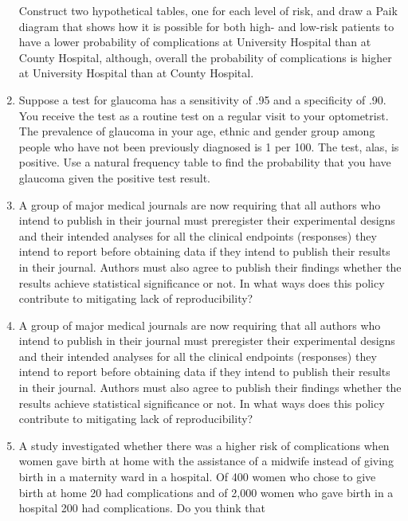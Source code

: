 \documentclass[
]{article}
\begin{document}
\begin{enumerate}
  Construct two hypothetical tables, one for each level of risk, and
  draw a Paik diagram that shows how it is possible for both high- and
  low-risk patients to have a lower probability of complications at
  University Hospital than at County Hospital, although, overall the
  probability of complications is higher at University Hospital than at
  County Hospital. \vspace{0px}
\item
  Suppose a test for glaucoma has a sensitivity of .95 and a specificity
  of .90. You receive the test as a routine test on a regular visit to
  your optometrist. The prevalence of glaucoma in your age, ethnic and
  gender group among people who have not been previously diagnosed is 1
  per 100. The test, alas, is positive. Use a natural frequency table to
  find the probability that you have glaucoma given the positive test
  result. \vspace{0px}
\item
  A group of major medical journals are now requiring that all authors
  who intend to publish in their journal must preregister their
  experimental designs and their intended analyses for all the clinical
  endpoints (responses) they intend to report before obtaining data if
  they intend to publish their results in their journal. Authors must
  also agree to publish their findings whether the results achieve
  statistical significance or not. In what ways does this policy
  contribute to mitigating lack of reproducibility? \vspace{0px}
\item
  A group of major medical journals are now requiring that all authors
  who intend to publish in their journal must preregister their
  experimental designs and their intended analyses for all the clinical
  endpoints (responses) they intend to report before obtaining data if
  they intend to publish their results in their journal. Authors must
  also agree to publish their findings whether the results achieve
  statistical significance or not. In what ways does this policy
  contribute to mitigating lack of reproducibility? \vspace{0px}
\item
  A study investigated whether there was a higher risk of complications
  when women gave birth at home with the assistance of a midwife instead
  of giving birth in a maternity ward in a hospital. Of 400 women who
  chose to give birth at home 20 had complications and of 2,000 women
  who gave birth in a hospital 200 had complications. Do you think that

\end{enumerate}
\end{document}
